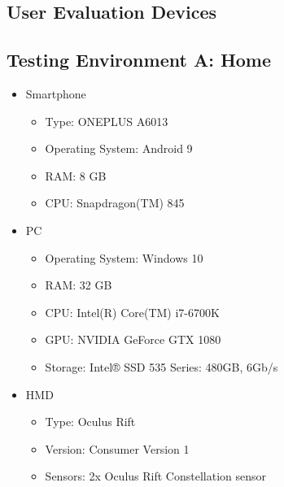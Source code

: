 
\begin{appendices}
  \chapter{User Evaluation Devices}\label{chapter:append-user-eval-devices}
  \section{Testing Environment A: Home}
  \begin{itemize}
    \item Smartphone
    \begin{itemize}
      \item Type: ONEPLUS A6013
      \item Operating System: Android 9
      \item RAM: 8 GB
      \item CPU: Snapdragon(TM) 845 %
    \end{itemize}
    \item \ac{PC}
    \begin{itemize}
      \item Operating System: Windows 10
      \item RAM: 32 GB
      \item CPU: Intel(R) Core(TM) i7-6700K %
      \item GPU: NVIDIA GeForce GTX 1080
      \item Storage: Intel® SSD 535 Series: 480GB, 6Gb/s
    \end{itemize}
    \item \ac{HMD}
    \begin{itemize}
      \item Type: Oculus Rift
      \item Version: Consumer Version 1
      \item Sensors: 2x Oculus Rift Constellation sensor
    \end{itemize}
  \end{itemize}


\end{appendices}
